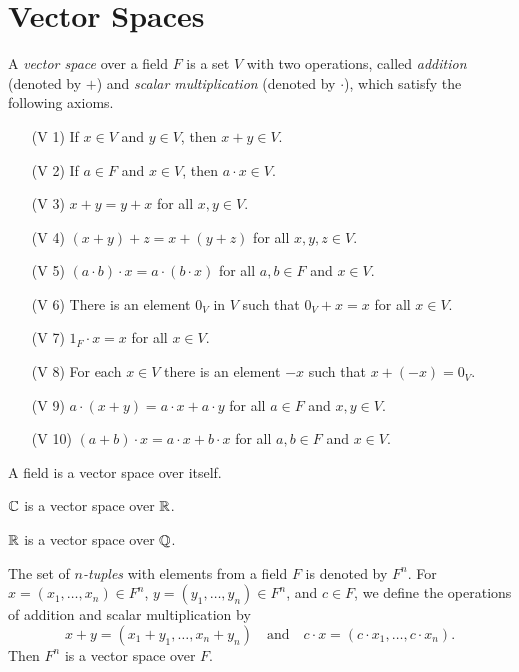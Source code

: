 \section{Vector Spaces}
\begin{definition}\label{def:vector-space}
  A \emph{vector space} over a field $F$ is a set $V$ with two operations,
  called \emph{addition} (denoted by $+$) and \emph{scalar multiplication}
  (denoted by $\cdot$), which satisfy the following axioms.
  \begin{enumerate}[leftmargin=3.5em]
    \item[(V 1)] If $x \in V$ and $y \in V$, then $x + y \in V$.
    \item[(V 2)] If $a \in F$ and $x \in V$, then $a \cdot x \in V$. 
    \item[(V 3)] $x + y = y + x$ for all $x, y \in V$.
    \item[(V 4)] $(x + y) + z = x + (y + z)$ for all $x, y, z \in V$.
    \item[(V 5)] $(a \cdot b) \cdot x = a \cdot (b \cdot x)$ for all
      $a, b \in F$ and $x \in V$. 
    \item[(V 6)] There is an element $0_V$ in $V$ such that $0_V + x = x$ for
      all $x \in V$.
    \item[(V 7)] $1_F \cdot x = x$ for all $x \in V$.
    \item[(V 8)] For each $x \in V$ there is an element $-x$ such that
      $x + (-x) = 0_V$.
    \item[(V 9)] $a \cdot (x + y) = a \cdot x + a \cdot y$ for all $a \in F$
      and $x, y \in V$.
    \item[(V 10)] $(a + b) \cdot x = a \cdot x + b \cdot x$ for all
      $a, b \in F$ and $x \in V$.
  \end{enumerate}
\end{definition}

\begin{example}
  A field is a vector space over itself.
\end{example}

\begin{example}
  $\mathbb{C}$ is a vector space over $\mathbb{R}$.
\end{example}

\begin{example}
  $\mathbb{R}$ is a vector space over $\mathbb{Q}$.
\end{example}

\begin{example}
  The set of \emph{$n$-tuples} with elements from a field $F$ is denoted by
  $F^n$.
  For $x = (x_1, \dots, x_n) \in F^n$, $y = (y_1, \dots, y_n) \in F^n$, and
  $c \in F$, we define the operations of addition and scalar multiplication by
  \begin{equation*}
    x + y = (x_1 + y_1, \dots, x_n + y_n)
    \quad \text{and} \quad
    c \cdot x = (c \cdot x_1, \dots, c \cdot x_n).
  \end{equation*}
  Then $F^n$ is a vector space over $F$.
\end{example}

